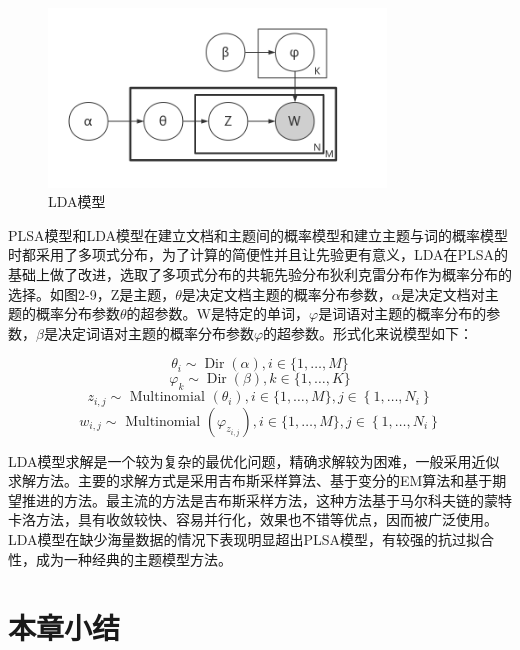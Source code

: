 \documentclass[winfonts,master,oneside,nobackinfo]{njuthesis}
\begin{document}
\begin{figure}[h]
\centering
\begin{minipage}[t]{\textwidth}
\centering
\includegraphics[width=0.8\textwidth]{./figure/lda.jpg}
\caption{LDA模型}
\label{lab:1}
\end{minipage}
\end{figure}

PLSA模型和LDA模型在建立文档和主题间的概率模型和建立主题与词的概率模型时都采用了多项式分布，为了计算的简便性并且让先验更有意义，LDA在PLSA的基础上做了改进，选取了多项式分布的共轭先验分布狄利克雷分布作为概率分布的选择。如图2-9，Z是主题，$\theta$是决定文档主题的概率分布参数，$\alpha$是决定文档对主题的概率分布参数$\theta$的超参数。W是特定的单词，$\varphi$是词语对主题的概率分布的参数，$\beta$是决定词语对主题的概率分布参数$\varphi$的超参数。形式化来说模型如下：

$$\theta _ { i } \sim \operatorname { Dir } ( \alpha ), i \in \{ 1 , \ldots , M \}$$
$$\varphi _ { k } \sim \operatorname { Dir } ( \beta ), k \in \{ 1 , \ldots , K \}$$
$$z _ { i , j } \sim \text { Multinomial } \left( \theta _ { i } \right), i \in \{ 1 , \ldots , M \},j \in \left\{ 1 , \ldots , N _ { i } \right\}$$
$$w _ { i , j } \sim \text { Multinomial } \left( \varphi _ { z _ { i , j } } \right), i \in \{ 1 , \ldots , M \},j \in \left\{ 1 , \ldots , N _ { i } \right\} $$

LDA模型求解是一个较为复杂的最优化问题，精确求解较为困难，一般采用近似求解方法。主要的求解方式是采用吉布斯采样算法、基于变分的EM算法和基于期望推进的方法。最主流的方法是吉布斯采样方法，这种方法基于马尔科夫链的蒙特卡洛方法，具有收敛较快、容易并行化，效果也不错等优点，因而被广泛使用。LDA模型在缺少海量数据的情况下表现明显超出PLSA模型，有较强的抗过拟合性，成为一种经典的主题模型方法。

\section{本章小结}
\end{document}
